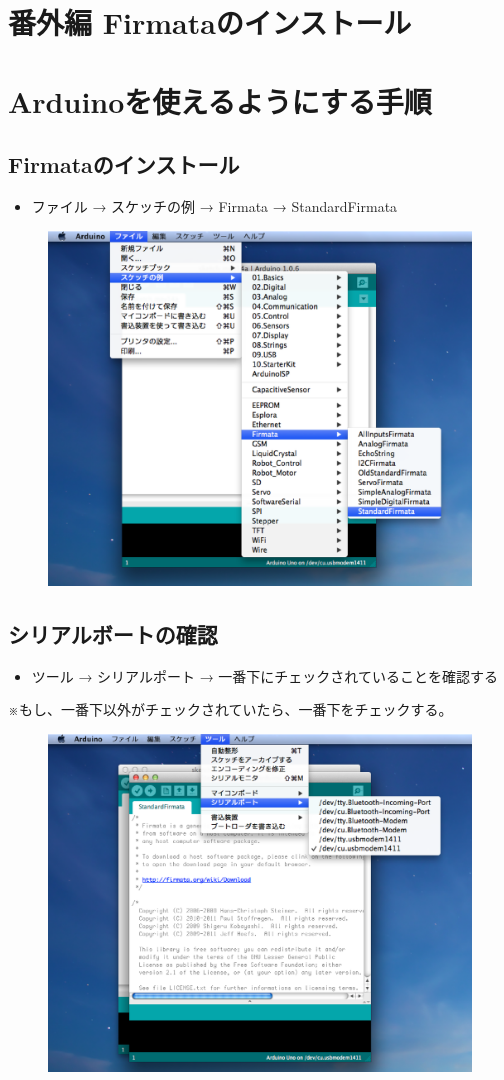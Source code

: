 \documentclass[11pt,a4paper]{jarticle}
\begin{document}
\section*{\LARGE{番外編 Firmataのインストール}}

\section*{Arduinoを使えるようにする手順}
\subsection*{Firmataのインストール}
\begin{itemize}
\item ファイル → スケッチの例 → Firmata → StandardFirmata
\end{itemize}

 \begin{figure}[h]
 \centering
 \includegraphics[width=0.63\columnwidth]{img/firmata3.eps}
\end{figure}

\subsection*{シリアルボートの確認}
\begin{itemize}
\item ツール → シリアルポート → 一番下にチェックされていることを確認する
\end{itemize}
※もし、一番下以外がチェックされていたら、一番下をチェックする。

 \begin{figure}[h]
 \centering
 \includegraphics[width=0.63\columnwidth]{img/firmata5.eps}
\end{figure}
\end{document}

